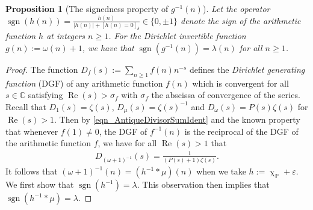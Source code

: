\documentclass[11pt,reqno,a4letter]{article}
\numberwithin{figure}{section}
\numberwithin{table}{section}
\newcommand{\Iverson}[1]{\ensuremath{\left[#1\right]_{\delta}}}
\renewcommand{\chi}{\upchi}
\theoremstyle{plain}
\newtheorem{prop}[theorem]{Proposition}
\numberwithin{theorem}{section}
\theoremstyle{definition}
\renewcommand{\Re}{\operatorname{Re}}
\begin{document}
\begin{prop}[The signedness property of $g^{-1}(n)$]
\label{prop_SignageDirInvsOfPosBddArithmeticFuncs_v1} 
Let the operator 
$\operatorname{sgn}(h(n)) = \frac{h(n)}{|h(n)| + \Iverson{h(n) = 0}} \in \{0, \pm 1\}$ denote the sign 
of the arithmetic function $h$ at integers $n \geq 1$. 
For the Dirichlet invertible function $g(n) := \omega(n) + 1$, 
we have that $\operatorname{sgn}(g^{-1}(n)) = \lambda(n)$ for all $n \geq 1$. 
\end{prop} 
\begin{proof} 
The function $D_f(s) := \sum_{n \geq 1} f(n) n^{-s}$ defines the 
\emph{Dirichlet generating function} (DGF) of any 
arithmetic function $f(n)$ which is convergent for all $s \in \mathbb{C}$ satisfying 
$\Re(s) > \sigma_f$ with $\sigma_f$ the abscissa of convergence of the series. 
Recall that $D_1(s) = \zeta(s)$, $D_{\mu}(s) = \zeta(s)^{-1}$ and $D_{\omega}(s) = P(s) \zeta(s)$ for 
$\Re(s) > 1$. 
Then by \eqref{eqn_AntiqueDivisorSumIdent} and the known property that whenever $f(1) \neq 0$, 
the DGF of $f^{-1}(n)$ is 
the reciprocal of the DGF of the arithmetic function $f$, 
we have for all $\Re(s) > 1$ that 
\begin{align} 
\label{eqn_DGF_of_gInvn} 
D_{(\omega+1)^{-1}}(s) = \frac{1}{(P(s)+1) \zeta(s)}. 
\end{align} 
It follows that $(\omega + 1)^{-1}(n) = (h^{-1} \ast \mu)(n)$ when we take 
$h := \chi_{\mathbb{P}} + \varepsilon$. 
We first show that $\operatorname{sgn}(h^{-1}) = \lambda$. 
This observation then implies 
that $\operatorname{sgn}(h^{-1} \ast \mu) = \lambda$. 


\end{proof}
\end{document}
